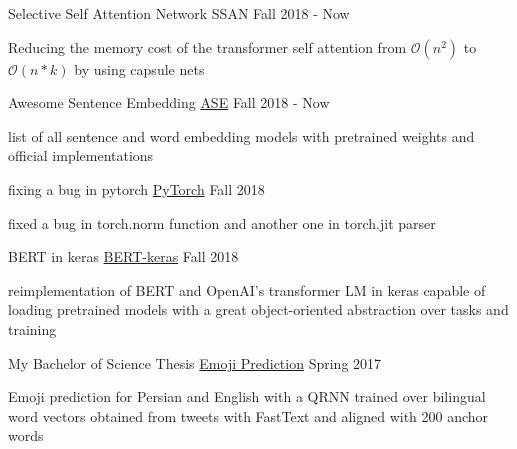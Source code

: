 

\begin{cventries}

\cventry
    {Selective Self Attention Network} %
    {SSAN} %
    {} %
    {Fall 2018 - Now} %
    {
      \begin{cvitems} %
        \item {Reducing the memory cost of the transformer self attention from $\mathcal{O}(n^{2})$ to $\mathcal{O}(n*k)$ by using capsule nets}
      \end{cvitems}
    }

\cventry
    {Awesome Sentence Embedding} %
    {\href{https://github.com/Separius/awesome-sentence-embedding}{ASE}} %
    {} %
    {Fall 2018 - Now} %
    {
      \begin{cvitems} %
        \item {list of all sentence and word embedding models with pretrained weights and official implementations}
      \end{cvitems}
    }
    
\cventry
	{fixing a bug in pytorch}
	{\href{https://github.com/pytorch/pytorch/pull/12722}{PyTorch}}
	{}
	{Fall 2018}
	{
		\begin{cvitems}
			\item {fixed a bug in torch.norm function and another one in torch.jit parser}
		\end{cvitems}
	}
    
\cventry
	{BERT in keras}
	{\href{https://github.com/Separius/BERT-keras}{BERT-keras}}
	{}
	{Fall 2018}
	{
		\begin{cvitems}
			\item {reimplementation of BERT and OpenAI's transformer LM in keras capable of loading pretrained models with a great object-oriented abstraction over tasks and training}
		\end{cvitems}
	}

\cventry
    {My Bachelor of Science Thesis} %
    {\href{https://github.com/Separius/EmojiPrediction}{Emoji Prediction}} %
    {} %
    {Spring 2017} %
    {
      \begin{cvitems} %
        \item {Emoji prediction for Persian and English with a QRNN trained over bilingual word vectors obtained from tweets with FastText and aligned with 200 anchor words}
      \end{cvitems}
    }


\end{cventries}
